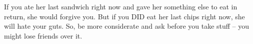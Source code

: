 \ex{}If you ate her last sandwich right now and gave her something else to eat in return, she would forgive you. But if you \MakeUppercase{did} eat her last chips right now, she will hate your guts. So, be more considerate and ask before you take stuff – you might lose friends over it.\xe
